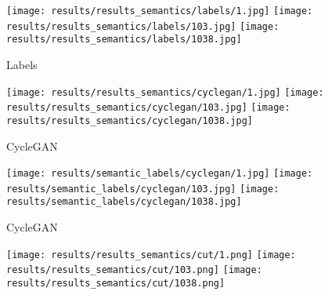 \begin{figure*}[t!]
    \centering
    \begin{subfigure}[t]{0.105\linewidth}

      \captionsetup{justification=centering, labelformat=empty, font=scriptsize}

      \texttt{[image: results/results\_semantics/labels/1.jpg]}
      \texttt{[image: results/results\_semantics/labels/103.jpg]}
      \texttt{[image: results/results\_semantics/labels/1038.jpg]}
      \caption{Labels}
    \end{subfigure}
    \begin{subfigure}[t]{0.105\linewidth}
      \captionsetup{justification=centering, labelformat=empty, font=scriptsize}

      \texttt{[image: results/results\_semantics/cyclegan/1.jpg]}
      \texttt{[image: results/results\_semantics/cyclegan/103.jpg]}
      \texttt{[image: results/results\_semantics/cyclegan/1038.jpg]}

      \caption{CycleGAN}
    \end{subfigure}
    \begin{subfigure}[t]{0.105\linewidth}
      \captionsetup{justification=centering, labelformat=empty, font=scriptsize}

      \texttt{[image: results/semantic\_labels/cyclegan/1.jpg]}
      \texttt{[image: results/semantic\_labels/cyclegan/103.jpg]}
      \texttt{[image: results/semantic\_labels/cyclegan/1038.jpg]}

      \caption{CycleGAN}
    \end{subfigure}
    \begin{subfigure}[t]{0.105\linewidth}
      \captionsetup{justification=centering, labelformat=empty, font=scriptsize}
      \texttt{[image: results/results\_semantics/cut/1.png]}
      \texttt{[image: results/results\_semantics/cut/103.png]}
      \texttt{[image: results/results\_semantics/cut/1038.png]}


\end{subfigure}
\end{figure*}
